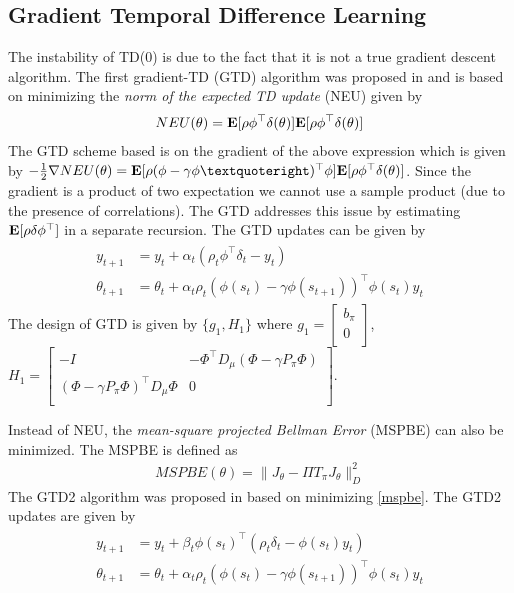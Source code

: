 \subsection{Gradient Temporal Difference Learning}
The instability of TD($0$) is due to the fact that it is not a true gradient descent algorithm. The first gradient-TD (GTD) algorithm was proposed in \cite{} and is based on minimizing the \emph{norm of the expected TD update} (NEU) given by
\begin{align}\label{neu}
NEU(\theta)=\mathbf{E}[\rho\phi^\top\delta(\theta)]\mathbf{E}[\rho\phi^\top\delta(\theta)]
\end{align}
The GTD scheme based is on the gradient of the above expression which is given by $-\frac{1}{2}\nabla NEU(\theta)=\E[\rho (\phi-\gamma\phi’)^\top \phi]\E[\rho \phi^\top\delta(\theta)]$. Since the gradient is a product of two expectation we cannot use a sample product (due to the presence of correlations). The GTD addresses this issue by estimating $\mathbf{E}[\rho\delta\phi^\top]$ in a separate recursion. The GTD updates can be given by
\begin{align}
\begin{split}
y_{t+1}&=y_t+\alpha_t(\rho_t\phi^\top\delta_t -y_t)\\
\theta_{t+1}&=\theta_t+\alpha_t\rho_t(\phi(s_t)-\gamma\phi(s_{t+1}))^\top\phi(s_t)y_t
\end{split}
\end{align}
The design of GTD is given by $\{g_1,H_1\}$ where $g_1=\begin{bmatrix}b_\pi\\ 0\\ \end{bmatrix}$, $H_1=\begin{bmatrix}-I &-\Phi^\top D_\mu (\Phi -\gamma P_\pi\Phi) \\ (\Phi -\gamma P_\pi\Phi)^\top D_\mu\Phi &0 \\ \end{bmatrix}$.\par
Instead of NEU, the \emph{mean-square projected Bellman Error} (MSPBE) can also be minimized. The MSPBE is defined as
\begin{align}\label{mspbe}
MSPBE(\theta)=\parallel J_\theta-\Pi T_\pi J_\theta \parallel^2_D
\end{align}
The GTD2 algorithm was proposed in \cite{} based on minimizing \eqref{mspbe}. The GTD2 updates are given by
\begin{align}
\begin{split}
y_{t+1}&=y_t+\beta_t\phi(s_t)^\top(\rho_t\delta_t-\phi(s_t)y_t)\\
\theta_{t+1}&=\theta_t+\alpha_t\rho_t(\phi(s_t)-\gamma\phi(s_{t+1}))^\top\phi(s_t)y_t
\end{split}
\end{align}
